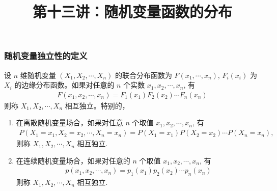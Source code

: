 \begin{frame}
	\frametitle{随机变量独立性的定义}
	\begin{defi}
	 设 $n$ 维随机变量 $(X_1,X_2,\cdots,X_n)$ 的联合分布函数为 $F (x_1,
		\cdots,x_n)$, $F_i (x_i)$ 为 $X_i$ 的边缘分布函数。如果对任意的 $n$ 个实数 $x_1,x_2,\cdots, x_n$, 有
		\begin{eqnarray*}
			F(x_1,x_2,\cdots, x_n)=F_1(x_1)F_2(x_2)\cdots F_n(x_n)
		\end{eqnarray*}
		则称 $X_1,X_2,\cdots, X_n$ 相互独立。特别的，
	\end{defi}
	\pause
	\begin{enumerate}[<+-|alert@+>]
		\item 在离散随机变量场合，如果对任意 $n$ 个取值 $x_1,x_2,\cdots, x_n$, 有
		{\small     \begin{eqnarray*}
				P(X_1=x_1,X_2=x_2,\cdots,X_n=x_n)=P(X_1=x_1)P(X_2=x_2)\cdots P(X_n=x_n),
		\end{eqnarray*}}
		则称 $X_1,X_2,\cdots, X_n$ 相互独立.


		\item 在连续随机变量场合，如果对任意的 $n$ 个取值 $x_1,x_2,\cdots, x_n$, 有
		\begin{eqnarray*}
			p(x_1,x_2,\cdots, x_n)=p_1(x_1)p_2(x_2)\cdots p_n(x_n)
		\end{eqnarray*}
		则称 $X_1,X_2,\cdots, X_n$ 相互独立.
	\end{enumerate}
\end{frame}



 \title[概率论]{第十三讲：随机变量函数的分布}
 \date{}



 	{ 
 		\begin{frame}
 			\titlepage
 		\end{frame}
 	}














